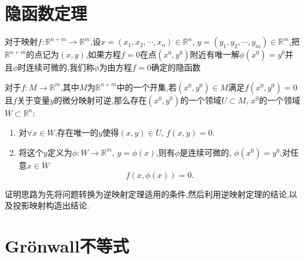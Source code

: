 \section{隐函数定理}
\begin{defn}[隐函数]\cite{rudin1964principles}
    对于映射$f:\mathbb{R}^{n+m}\to\mathbb{R}^m$,设$x=(x_1,x_2,\cdots,x_n)\in\mathbb{R}^n$, $y=(y_1,y_2,\cdots,y_m)\in\mathbb{R}^m$,把$\mathbb{R}^{n+m}$的点记为$(x,y)$,如果方程$f=0$在点$(x^0,y^0)$附近有唯一解$\phi(x^0)=y^0$并且$\phi$时连续可微的,我们称$\phi$为由方程$f=0$确定的隐函数
\end{defn}
\begin{thm}\cite{rudin1964principles}
    对于$f:M\to \mathbb{R}^m$,其中$M$为$\mathbb{R}^{n+m}$中的一个开集,若$(x^0,y^0)\in M$满足$f(x^0,y^0)=0$且$f$关于变量$y$的微分映射可逆,那么存在$(x^0,y^0)$的一个领域$U\subset M$, $x^0$的一个领域$W\subset\mathbb{R}^n$:
    \begin{enumerate}
        \item 对$\forall x\in W$,存在唯一的$y$使得$(x,y)\in U$, $f(x,y)=0$. 
        \item 将这个$y$定义为$\phi:W\to\mathbb{R}^m$, $y=\phi(x)$,则有$\phi$是连续可微的, $\phi(x^0)=y^0$,对任意$x\in W$
        \begin{equation}
            f(x,\phi(x))=0.
        \end{equation}
    \end{enumerate}
\end{thm}
\begin{pf}
    证明思路为先将问题转换为逆映射定理适用的条件,然后利用逆映射定理的结论,以及投影映射构造出结论. 
\end{pf}
\section{Grönwall不等式}

